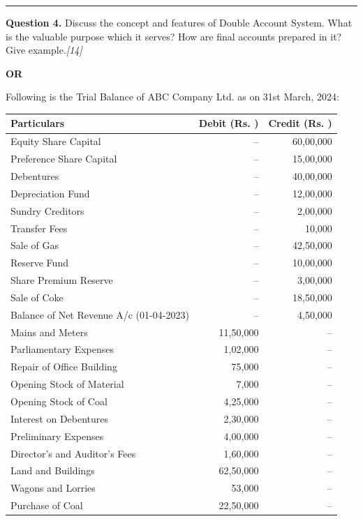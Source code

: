 \documentclass[11pt,a4paper]{article}
\newcommand{\pts}[1]{\hfill   \textit{[#1]}}
\begin{document}
\medskip\rule{\linewidth}{0.2pt}

\pagebreak




\noindent   \textbf{Question 4.}
Discuss the concept and features of Double Account System. What is the valuable purpose which it serves? How are final accounts prepared in it? Give example.\pts{14}

\centerline{   \textbf{OR}}

Following is the Trial Balance of ABC Company Ltd. as on 31st March, 2024:


\begin{center}
\small

\begin{tabular}{|l|r|r|}
\hline
   \textbf{Particulars} &   \textbf{Debit (Rs. )} &   \textbf{Credit (Rs. )} \\
\hline
Equity Share Capital & -- & 60,00,000 \\
Preference Share Capital & -- & 15,00,000 \\
Debentures & -- & 40,00,000 \\
Depreciation Fund & -- & 12,00,000 \\
Sundry Creditors & -- & 2,00,000 \\
Transfer Fees & -- & 10,000 \\
Sale of Gas & -- & 42,50,000 \\
Reserve Fund & -- & 10,00,000 \\
Share Premium Reserve & -- & 3,00,000 \\
Sale of Coke & -- & 18,50,000 \\
Balance of Net Revenue A/c (01-04-2023) & -- & 4,50,000 \\
Mains and Meters & 11,50,000 & -- \\
Parliamentary Expenses & 1,02,000 & -- \\
Repair of Office Building & 75,000 & -- \\
Opening Stock of Material & 7,000 & -- \\
Opening Stock of Coal & 4,25,000 & -- \\
Interest on Debentures & 2,30,000 & -- \\
Preliminary Expenses & 4,00,000 & -- \\
Director's and Auditor's Fees & 1,60,000 & -- \\
Land and Buildings & 62,50,000 & -- \\
Wagons and Lorries & 53,000 & -- \\
Purchase of Coal & 22,50,000 & -- \\

\end{tabular}
\end{center}
\end{document}
